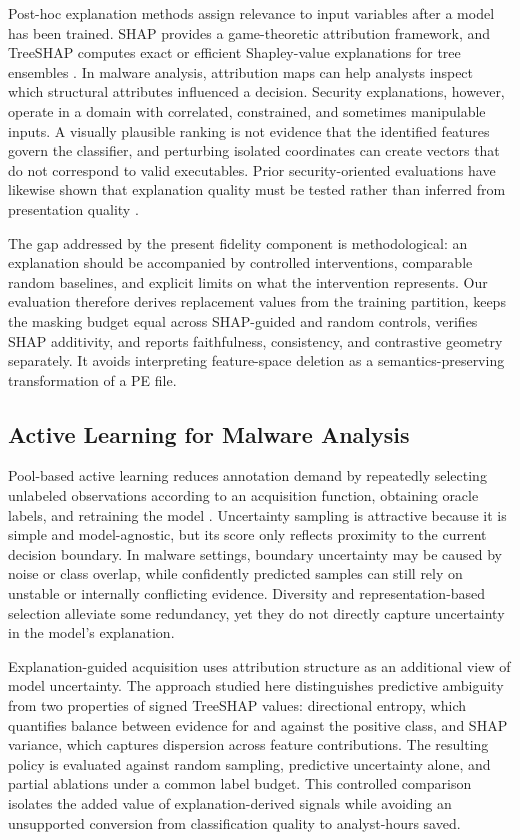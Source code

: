 \documentclass{IEEEtran}
\begin{document}
Post-hoc explanation methods assign relevance to input variables after a model has been trained. SHAP provides a game-theoretic attribution framework, and TreeSHAP computes exact or efficient Shapley-value explanations for tree ensembles \cite{lundberg2017unified,lundberg2020local}. In malware analysis, attribution maps can help analysts inspect which structural attributes influenced a decision. Security explanations, however, operate in a domain with correlated, constrained, and sometimes manipulable inputs. A visually plausible ranking is not evidence that the identified features govern the classifier, and perturbing isolated coordinates can create vectors that do not correspond to valid executables. Prior security-oriented evaluations have likewise shown that explanation quality must be tested rather than inferred from presentation quality \cite{warnecke2020evaluating}.

The gap addressed by the present fidelity component is methodological: an explanation should be accompanied by controlled interventions, comparable random baselines, and explicit limits on what the intervention represents. Our evaluation therefore derives replacement values from the training partition, keeps the masking budget equal across SHAP-guided and random controls, verifies SHAP additivity, and reports faithfulness, consistency, and contrastive geometry separately. It avoids interpreting feature-space deletion as a semantics-preserving transformation of a PE file.

\subsection{Active Learning for Malware Analysis}

Pool-based active learning reduces annotation demand by repeatedly selecting unlabeled observations according to an acquisition function, obtaining oracle labels, and retraining the model \cite{settles2009active}. Uncertainty sampling is attractive because it is simple and model-agnostic, but its score only reflects proximity to the current decision boundary. In malware settings, boundary uncertainty may be caused by noise or class overlap, while confidently predicted samples can still rely on unstable or internally conflicting evidence. Diversity and representation-based selection alleviate some redundancy, yet they do not directly capture uncertainty in the model's explanation.

Explanation-guided acquisition uses attribution structure as an additional view of model uncertainty. The approach studied here distinguishes predictive ambiguity from two properties of signed TreeSHAP values: directional entropy, which quantifies balance between evidence for and against the positive class, and SHAP variance, which captures dispersion across feature contributions. The resulting policy is evaluated against random sampling, predictive uncertainty alone, and partial ablations under a common label budget. This controlled comparison isolates the added value of explanation-derived signals while avoiding an unsupported conversion from classification quality to analyst-hours saved.

\end{document}
